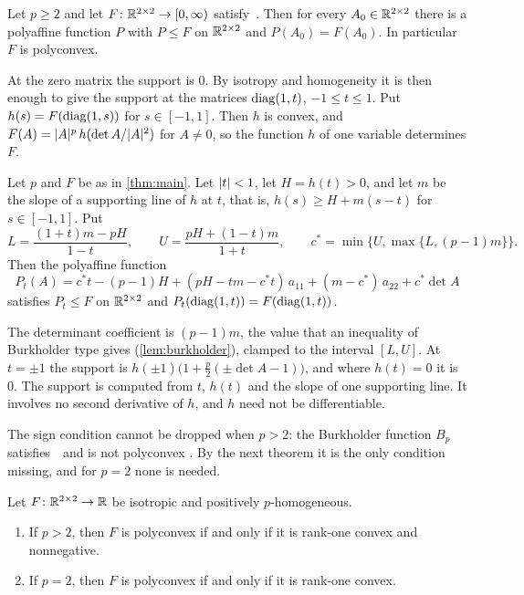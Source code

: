 \begin{theorem}\label{thm:main}
Let $p\ge2$ and let $F\colon\mathbb{R}^{2\times 2}\to[0,\infty)$ satisfy~\Hyp. Then for every $A_0\in\mathbb{R}^{2\times 2}$ there is a
polyaffine function $P$ with $P\le F$ on $\mathbb{R}^{2\times 2}$ and $P(A_0)=F(A_0)$. In particular $F$ is
polyconvex.
\end{theorem}

At the zero matrix the support is $0$. By isotropy and homogeneity it is then enough to give the
support at the matrices $\operatorname{diag}(1,t)$, $-1\le t\le1$. Put $h(s)=F(\operatorname{diag}(1,s))$ for
$s\in[-1,1]$. Then $h$ is convex, and $F(A)=\lvert A\rvert^p\,h(\det A/\lvert A\rvert^2)$ for $A\ne0$, so the
function $h$ of one variable determines $F$.

\begin{theorem}\label{thm:closed}
Let $p$ and $F$ be as in \cref{thm:main}. Let $\lvert t\rvert<1$, let $H=h(t)>0$, and let $m$ be the slope
of a supporting line of $h$ at $t$, that is, $h(s)\ge H+m(s-t)$ for $s\in[-1,1]$. Put
\[
  L=\frac{(1+t)m-pH}{1-t},\qquad U=\frac{pH+(1-t)m}{1+t},\qquad
  c^\ast=\min\bigl\{U,\max\{L,(p-1)m\}\bigr\}.
\]
Then the polyaffine function
\[
  P_t(A)=c^\ast t-(p-1)H+(pH-tm-c^\ast t)\,a_{11}+(m-c^\ast)\,a_{22}+c^\ast\det A
\]
satisfies $P_t\le F$ on $\mathbb{R}^{2\times 2}$ and $P_t(\operatorname{diag}(1,t))=F(\operatorname{diag}(1,t))$.
\end{theorem}

The determinant coefficient is $(p-1)m$, the value that an inequality of Burkholder type gives
(\cref{lem:burkholder}), clamped to the interval $[L,U]$. At $t=\pm1$ the support is
$h(\pm1)\bigl(1+\tfrac p2(\pm\det A-1)\bigr)$, and where $h(t)=0$ it is $0$. The support is
computed from $t$, $h(t)$ and the slope of one supporting line. It involves no second derivative
of $h$, and $h$ need not be differentiable.

The sign condition cannot be dropped when $p>2$: the Burkholder function $B_p$ satisfies~\Hyp\
and is not polyconvex \cite[Remark~1.4, Proposition~4.6]{GuerraKristensen2022}. By the next
theorem it is the only condition missing, and for $p=2$ none is needed.

\begin{theorem}\label{thm:iff}
Let $F\colon\mathbb{R}^{2\times 2}\to\mathbb{R}$ be isotropic and positively $p$-homogeneous.
\begin{enumerate}[label=\textup{(\alph*)}]
\item If $p>2$, then $F$ is polyconvex if and only if it is rank-one convex and nonnegative.
\item If $p=2$, then $F$ is polyconvex if and only if it is rank-one convex.
\end{enumerate}
\end{theorem}

